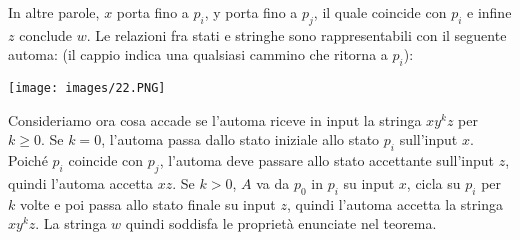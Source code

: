 \documentclass[12pt]{article}
\begin{document}
In altre parole, $x$ porta fino a $p_i$, y porta fino a $p_j$, il quale coincide con $p_i$ e infine $z$ conclude $w$. Le relazioni fra stati e stringhe sono rappresentabili con il seguente automa: (il cappio indica una qualsiasi cammino che ritorna a $p_i$):
\begin{center}
    \texttt{[image: images/22.PNG]}
\end{center}
Consideriamo ora cosa accade se l'automa riceve in input la stringa $xy^kz$ per $k \geq 0$. Se $k = 0$, l'automa passa dallo stato iniziale allo stato $p_i$ sull'input $x$. Poiché $p_i$ coincide con $p_j$, l'automa deve passare allo stato accettante sull'input $z$, quindi l'automa accetta $xz$. \newline
Se $k > 0$, $A$ va da $p_0$ in $p_i$ su input $x$, cicla su $p_i$ per $k$ volte e poi passa allo stato finale su input $z$, quindi l'automa accetta la stringa $xy^kz$. La stringa $w$ quindi soddisfa le proprietà enunciate nel teorema.
\end{document}
